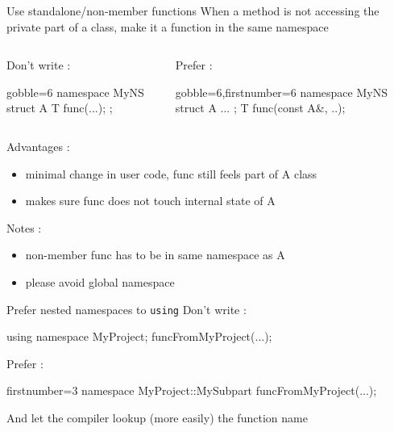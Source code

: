 \begin{frame}[fragile]
  \begin{block}{Use standalone/non-member functions}
    When a method is not accessing the private part of a class, make it a function in the same namespace
    \vspace{-1mm}
    \begin{columns}[T]
      \begin{column}{.35\textwidth}
        Don't write :
        \vspace{-1mm}
        \begin{cppcode*}{gobble=6}
          namespace MyNS {
            struct A {
              T func(...);
            };
          }
        \end{cppcode*}
      \end{column}
      \begin{column}{.35\textwidth}
        Prefer :
        \vspace{-1mm}
        \begin{cppcode*}{gobble=6,firstnumber=6}
          namespace MyNS {
            struct A { ... };
            T func(const A&, ..);
          }
        \end{cppcode*}
      \end{column}
    \end{columns}
    \vspace{.2cm}
    Advantages :
    \begin{itemize}
    \item minimal change in user code, func still feels part of A class
    \item makes sure func does not touch internal state of A
    \end{itemize}
    Notes :
    \begin{itemize}
    \item non-member func has to be in same namespace as A
    \item please avoid global namespace
    \end{itemize}
  \end{block}
\end{frame}

\begin{frame}[fragile]
  \begin{block}{Prefer nested namespaces to \texttt{using}}
    Don't write :
    \begin{cppcode}
      using namespace MyProject;
      funcFromMyProject(...);
    \end{cppcode}
    Prefer :
    \begin{cppcode*}{firstnumber=3}
      namespace MyProject::MySubpart {
        funcFromMyProject(...);
      }
    \end{cppcode*}
    And let the compiler lookup (more easily) the function name
  \end{block}
\end{frame}

